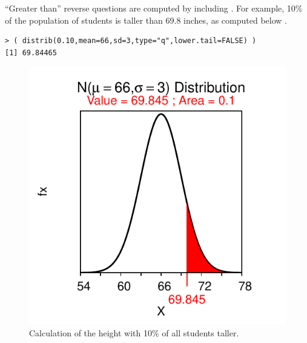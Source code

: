 \documentclass[10pt,openany]{book}\usepackage[]{graphicx}\usepackage[]{color}
\makeatletter
\newenvironment{kframe}{%
 \def\at@end@of@kframe{}%
 \ifinner\ifhmode%
  \def\at@end@of@kframe{\end{minipage}}%
  \begin{minipage}{\columnwidth}%
 \fi\fi%
 \def\FrameCommand##1{\hskip\@totalleftmargin \hskip-\fboxsep
 \colorbox{shadecolor}{##1}\hskip-\fboxsep
     \hskip-\linewidth \hskip-\@totalleftmargin \hskip\columnwidth}%
 \MakeFramed {\advance\hsize-\width
   \@totalleftmargin\z@ \linewidth\hsize
   \@setminipage}}%
 {\par\unskip\endMakeFramed%
 \at@end@of@kframe}
\newenvironment{knitrout}{}{} %
\makeatother
\begin{document}
``Greater than'' reverse questions are computed by including . For example, 10\% of the population of students is taller than 69.8 inches, as computed below .
\begin{knitrout}
\color{fgcolor}\begin{kframe}
\begin{verbatim}
> ( distrib(0.10,mean=66,sd=3,type="q",lower.tail=FALSE) )
[1] 69.84465
\end{verbatim}
\end{kframe}\begin{figure}[hbtp]

{\centering \includegraphics[width=.4\linewidth]{Figs/NormZCalc5-1} 

}

\caption[Calculation of the height with 10\% of all students taller]{Calculation of the height with 10\% of all students taller.}\label{fig:NormZCalc5}
\end{figure}


\end{knitrout}
\end{document}
